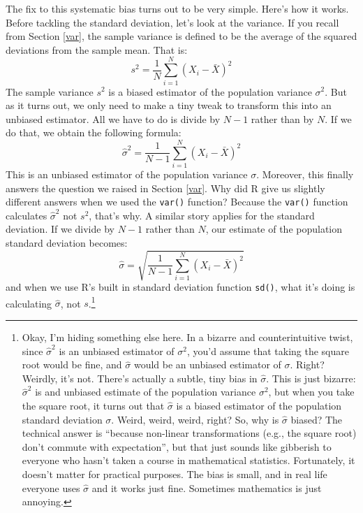 \documentclass[
]{book}
\begin{document}
The fix to this systematic bias turns out to be very simple. Here's how it works. Before tackling the standard deviation, let's look at the variance. If you recall from Section \ref{var}, the sample variance is defined to be the average of the squared deviations from the sample mean. That is:
\[
s^2 = \frac{1}{N} \sum_{i=1}^N (X_i - \bar{X})^2
\]
The sample variance \(s^2\) is a biased estimator of the population variance \(\sigma^2\). But as it turns out, we only need to make a tiny tweak to transform this into an unbiased estimator. All we have to do is divide by \(N-1\) rather than by \(N\). If we do that, we obtain the following formula:
\[
\hat\sigma^2 = \frac{1}{N-1} \sum_{i=1}^N (X_i - \bar{X})^2 
\]
This is an unbiased estimator of the population variance \(\sigma\). Moreover, this finally answers the question we raised in Section \ref{var}. Why did R give us slightly different answers when we used the \texttt{var()} function? Because the \texttt{var()} function calculates \(\hat\sigma^2\) not \(s^2\), that's why. A similar story applies for the standard deviation. If we divide by \(N-1\) rather than \(N\), our estimate of the population standard deviation becomes:
\[
\hat\sigma = \sqrt{\frac{1}{N-1} \sum_{i=1}^N (X_i - \bar{X})^2} 
\]
and when we use R's built in standard deviation function \texttt{sd()}, what it's doing is calculating \(\hat\sigma\), not \(s\).\footnote{Okay, I'm hiding something else here. In a bizarre and counterintuitive twist, since \(\hat\sigma^2\) is an unbiased estimator of \(\sigma^2\), you'd assume that taking the square root would be fine, and \(\hat\sigma\) would be an unbiased estimator of \(\sigma\). Right? Weirdly, it's not. There's actually a subtle, tiny bias in \(\hat\sigma\). This is just bizarre: \(\hat\sigma^2\) is and unbiased estimate of the population variance \(\sigma^2\), but when you take the square root, it turns out that \(\hat\sigma\) is a biased estimator of the population standard deviation \(\sigma\). Weird, weird, weird, right? So, why is \(\hat\sigma\) biased? The technical answer is ``because non-linear transformations (e.g., the square root) don't commute with expectation'', but that just sounds like gibberish to everyone who hasn't taken a course in mathematical statistics. Fortunately, it doesn't matter for practical purposes. The bias is small, and in real life everyone uses \(\hat\sigma\) and it works just fine. Sometimes mathematics is just annoying.}
\end{document}
